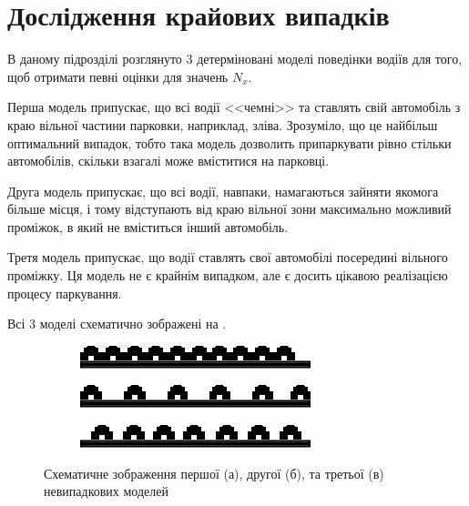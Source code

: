 \section{Дослідження крайових випадків}

В даному підрозділі розглянуто 3 детерміновані моделі поведінки водіїв для того, щоб отримати певні оцінки для значень $N_{x}$.

Перша модель припускає, що всі водії <<чемні>> та ставлять свій автомобіль з краю вільної частини парковки, наприклад, зліва. Зрозуміло, що це найбільш оптимальний випадок, тобто така модель дозволить припаркувати рівно стільки автомобілів, скільки взагалі може вміститися на парковці.

Друга модель припускає, що всі водії, навпаки, намагаються зайняти якомога більше місця, і тому відступають від краю вільної зони максимально можливий проміжок, в який не вміститься інший автомобіль.

Третя модель припускає, що водії ставлять свої автомобілі посередині вільного проміжку. Ця модель не є крайнім випадком, але є досить цікавою реалізацією процесу паркування.

Всі 3 моделі схематично зображені на .

\begin{figure}[bh]
	\begin{subfigure}[b]{0.32\textwidth}    
		\centering
		\includegraphics[width=1\linewidth]{chapter_Asymptotics/img/parking_trivial1}
		\caption{}
	\end{subfigure}
	\begin{subfigure}[b]{0.32\textwidth}    
		\centering
		\includegraphics[width=1\linewidth]{chapter_Asymptotics/img/parking_trivial2}
		\caption{}
	\end{subfigure}
	\begin{subfigure}[b]{0.32\textwidth}    
		\centering
		\includegraphics[width=1\linewidth]{chapter_Asymptotics/img/parking_trivial3}
		\caption{}
	\end{subfigure}
	\caption{Схематичне зображення першої (а), другої (б), та третьої (в) невипадкових моделей}
	\label{fig:trivial_cases}
\end{figure}

